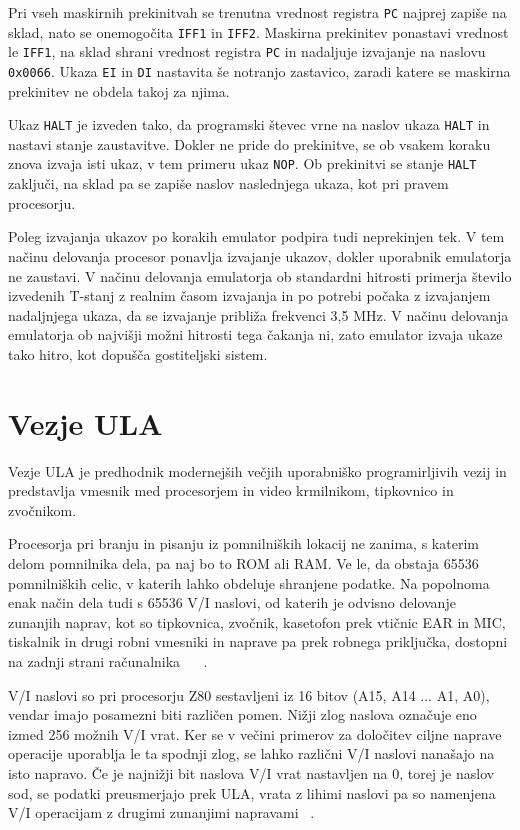 \documentclass[a4paper, 12pt, openright]{book}
\begin{document}
    Pri vseh maskirnih prekinitvah se trenutna vrednost registra \texttt{PC}
    najprej zapiše na sklad, nato se onemogočita \texttt{IFF1} in \texttt{IFF2}.
    Maskirna prekinitev ponastavi vrednost le \texttt{IFF1}, na sklad shrani
    vrednost registra \texttt{PC} in nadaljuje izvajanje na naslovu \texttt{0x0066}.
    Ukaza \texttt{EI} in \texttt{DI} nastavita še notranjo zastavico, zaradi
    katere se maskirna prekinitev ne obdela takoj za njima.

    Ukaz \texttt{HALT} je izveden tako, da programski števec vrne na naslov
    ukaza \texttt{HALT} in nastavi stanje zaustavitve. Dokler ne pride do
    prekinitve, se ob vsakem koraku znova izvaja isti ukaz, v tem primeru ukaz
    \texttt{NOP}. Ob prekinitvi se stanje \texttt{HALT} zaključi, na sklad pa se
    zapiše naslov naslednjega ukaza, kot pri pravem procesorju.

    Poleg izvajanja ukazov po korakih emulator podpira tudi neprekinjen tek. V
    tem načinu delovanja procesor ponavlja izvajanje ukazov, dokler uporabnik emulatorja
    ne zaustavi. V načinu delovanja emulatorja ob standardni hitrosti primerja
    število izvedenih T-stanj z realnim časom izvajanja in po potrebi počaka z
    izvajanjem nadaljnjega ukaza, da se izvajanje približa frekvenci 3,5 MHz. V
    načinu delovanja emulatorja ob najvišji možni hitrosti tega čakanja ni, zato emulator
    izvaja ukaze tako hitro, kot dopušča gostiteljski sistem.

    \chapter{Vezje ULA}
    \label{ula}

    Vezje ULA je predhodnik modernejših večjih uporabniško programirljivih vezij
    in predstavlja vmesnik med procesorjem in video krmilnikom, tipkovnico in zvočnikom.

    Procesorja pri branju in pisanju iz pomnilniških lokacij ne zanima, s
    katerim delom pomnilnika dela, pa naj bo to ROM ali RAM. Ve le, da obstaja 65536
    pomnilniških celic, v katerih lahko obdeluje shranjene podatke. Na popolnoma enak
    način dela tudi s 65536 V/I naslovi, od katerih je odvisno delovanje
    zunanjih naprav, kot so tipkovnica, zvočnik, kasetofon prek vtičnic EAR in MIC,
    tiskalnik in drugi robni vmesniki in naprave pa prek robnega priključka, dostopni
    na zadnji strani računalnika ~\cite{zxspectrumbasicprogramming} ~\cite{strojnijezikzaprocesorz80}.

    V/I naslovi so pri procesorju Z80 sestavljeni iz 16 bitov (A15, A14 ... A1,
    A0), vendar imajo posamezni biti različen pomen. Nižji zlog naslova označuje eno
    izmed 256 možnih V/I vrat. Ker se v večini primerov za določitev ciljne
    naprave operacije uporablja le ta spodnji zlog, se lahko različni V/I naslovi
    nanašajo na isto napravo. Če je najnižji bit naslova V/I vrat nastavljen na
    0, torej je naslov sod, se podatki preusmerjajo prek ULA, vrata z lihimi naslovi
    pa so namenjena V/I operacijam z drugimi zunanjimi napravami ~\cite{strojnijezikzaprocesorz80,
    zxspectrumbasicprogramming}.
\end{document}

